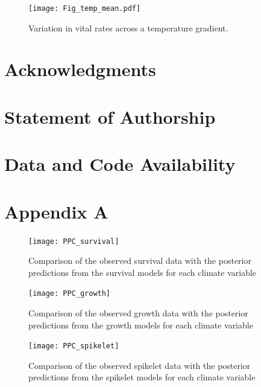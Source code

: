 \documentclass[11pt]{article}
\begin{document}
\begin{figure}[H]
\texttt{[image: Fig\_temp\_mean.pdf]}
\caption{Variation in vital rates across a temperature gradient.
}
\label{fig:vital}
\end{figure}


\section*{Acknowledgments}



\section*{Statement of Authorship}

\section*{Data and Code Availability}
\newpage{}	
\section*{Appendix A}
\renewcommand{\thefigure}{A\arabic{figure}}
\setcounter{figure}{0}
	
\renewcommand{\thetable}{A\arabic{table}}
\setcounter{equation}{0}  %
\setcounter{figure}{0}
\setcounter{table}{0}

\begin{figure}[h!]
\texttt{[image: PPC\_survival]}
\caption{Comparison of the observed survival data with the posterior predictions from the survival models for each climate variable}
\label{sup:ppc_surv}
\end{figure}
\clearpage

\begin{figure}[h!]
\texttt{[image: PPC\_growth]}
\caption{Comparison of the observed growth data with the posterior predictions from the growth models for each climate variable}
\label{sup:ppc_growth}
\end{figure}
\clearpage

\begin{figure}[h!]
\texttt{[image: PPC\_spikelet]}
\caption{Comparison of the observed spikelet data with the posterior predictions from the spikelet models for each climate variable}
\label{sup:ppc_spikelet}
\end{figure}
\clearpage
\end{document}
